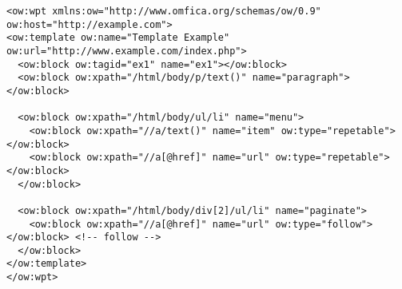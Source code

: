 \begin{lstlisting}
<ow:wpt xmlns:ow="http://www.omfica.org/schemas/ow/0.9"
ow:host="http://example.com">
<ow:template ow:name="Template Example" ow:url="http://www.example.com/index.php">
  <ow:block ow:tagid="ex1" name="ex1"></ow:block>
  <ow:block ow:xpath="/html/body/p/text()" name="paragraph"></ow:block>
  
  <ow:block ow:xpath="/html/body/ul/li" name="menu">
    <ow:block ow:xpath="//a/text()" name="item" ow:type="repetable"></ow:block>
    <ow:block ow:xpath="//a[@href]" name="url" ow:type="repetable"></ow:block>
  </ow:block>
  
  <ow:block ow:xpath="/html/body/div[2]/ul/li" name="paginate">
    <ow:block ow:xpath="//a[@href]" name="url" ow:type="follow"></ow:block> <!-- follow -->
  </ow:block>
</ow:template> 
</ow:wpt>
\end{lstlisting}


